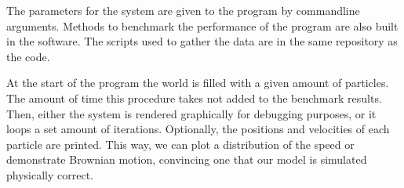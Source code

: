 The parameters for the system are given to the program by commandline 
arguments. Methods to benchmark the performance of the program are also built 
in the software. The scripts used to gather the data are in the same repository 
as the code.

At the start of the program the world is filled with a given amount of 
particles. The amount of time this procedure takes not added to the benchmark 
results.  Then, either the system is rendered graphically for debugging 
purposes, or it loops a set amount of iterations. Optionally, the positions 
and velocities of each particle are printed. This way, we can plot a 
distribution of the speed or demonstrate Brownian motion, convincing one 
that our model is simulated physically correct.
